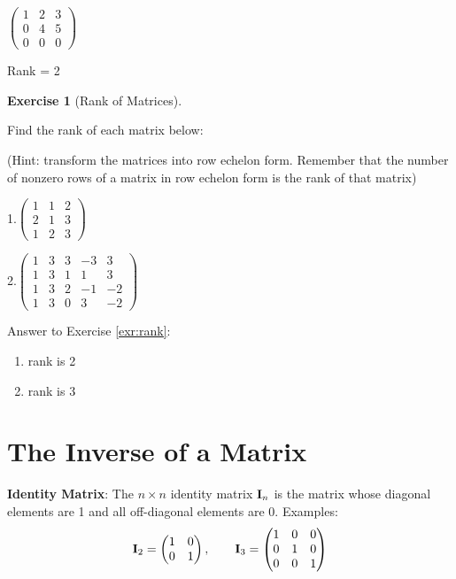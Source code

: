 \documentclass[
]{book}
\theoremstyle{definition}
\theoremstyle{definition}
\theoremstyle{definition}
\newtheorem{exercise}{Exercise}[chapter]
\theoremstyle{definition}
\theoremstyle{remark}
\begin{document}
\(\begin{pmatrix} 1 & 2 & 3 \\ 0 & 4 & 5 \\ 0 & 0 & 0 \end{pmatrix}\)

Rank = 2

\begin{exercise}[Rank of Matrices]
\protect\hypertarget{exr:rank}{}{\label{exr:rank} {} }

Find the rank of each matrix below:

(Hint: transform the matrices into row echelon form. Remember that the number of nonzero rows of a matrix in row echelon form is the rank of that matrix)

1.\(\begin{pmatrix} 1 & 1 & 2 \\ 2 & 1 & 3 \\ 1 & 2 & 3 \end{pmatrix}\)

\bigskip

2.\(\begin{pmatrix} 1 & 3 & 3 & -3 & 3\\ 1 & 3 & 1 & 1 & 3 \\ 1 & 3 & 2 & -1 & -2 \\ 1 & 3 & 0 & 3 & -2 \end{pmatrix}\)
\end{exercise}

Answer to Exercise \ref{exr:rank}:

\begin{enumerate}
\def\labelenumi{\arabic{enumi}.}
\item
  rank is 2
\item
  rank is 3
\end{enumerate}

\hypertarget{the-inverse-of-a-matrix}{%
\section{The Inverse of a Matrix}\label{the-inverse-of-a-matrix}}

\textbf{Identity Matrix}: The \(n\times n\) identity matrix \({\bf I}_n\) is the matrix whose diagonal elements are 1 and all off-diagonal elements are 0. Examples:
\[ {\bf I}_2=\begin{pmatrix} 1&0\\0&1 \end{pmatrix}, \qquad {\bf I}_3=\begin{pmatrix} 1&0&0\\ 0&1&0\\ 
            0&0&1 \end{pmatrix}\]
\end{document}
